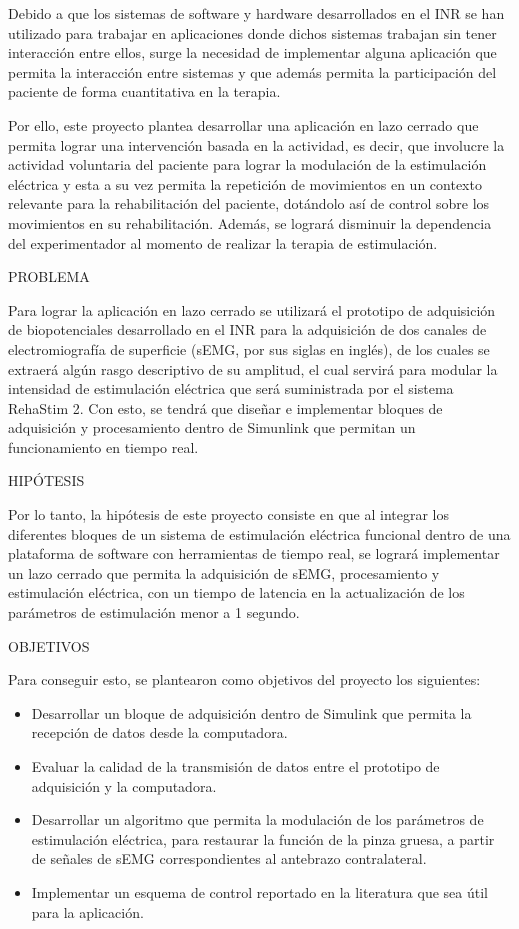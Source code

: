 Debido a que los sistemas de software y hardware desarrollados en el INR se han utilizado para trabajar en aplicaciones donde dichos sistemas trabajan sin tener interacción entre ellos, surge la necesidad de implementar alguna aplicación que permita la interacción entre sistemas y que además permita la participación del paciente de forma cuantitativa en la terapia.

Por ello, este proyecto plantea desarrollar una aplicación en lazo cerrado que permita lograr una intervención basada en la actividad, es decir, que involucre la actividad voluntaria del paciente para lograr la modulación de la estimulación eléctrica y esta a su vez permita la repetición de movimientos en un contexto relevante para la rehabilitación del paciente, dotándolo así de control sobre los movimientos en su rehabilitación. Además, se logrará disminuir la dependencia del experimentador al momento de realizar la terapia de estimulación.

{\color{blue}PROBLEMA\\}

Para lograr la aplicación en lazo cerrado se utilizará el prototipo de adquisición de biopotenciales desarrollado en el INR  para la adquisición de dos canales de electromiografía de superficie (sEMG, por sus siglas en inglés), de los cuales se extraerá algún rasgo descriptivo de su amplitud, el cual servirá para modular la intensidad de estimulación eléctrica que será suministrada por el sistema RehaStim 2. Con esto, se tendrá que diseñar e implementar bloques de adquisición y procesamiento dentro de Simunlink que permitan un funcionamiento en tiempo real.

{\color{blue}HIPÓTESIS\\}

Por lo tanto, la hipótesis de este proyecto consiste en que al integrar los diferentes bloques de un sistema de estimulación eléctrica funcional dentro de una plataforma de software con herramientas de tiempo real, se logrará implementar un lazo cerrado que permita la adquisición de sEMG, procesamiento y estimulación eléctrica, con un tiempo de latencia en la actualización de los parámetros de estimulación menor a 1 segundo.

{\color{blue}OBJETIVOS\\}

Para conseguir esto, se plantearon como objetivos del proyecto los siguientes:

\begin{itemize}
	\item Desarrollar un bloque de adquisición dentro de Simulink que permita la recepción de datos desde la computadora.
	\item Evaluar la calidad de la transmisión de datos entre el prototipo de adquisición y la computadora.
	\item Desarrollar un algoritmo que permita la modulación de los parámetros de estimulación eléctrica, para restaurar la función de la pinza gruesa, a partir de señales de sEMG correspondientes al antebrazo contralateral.
	\item Implementar un esquema de control reportado en la literatura que sea útil para la aplicación.
\end{itemize}
